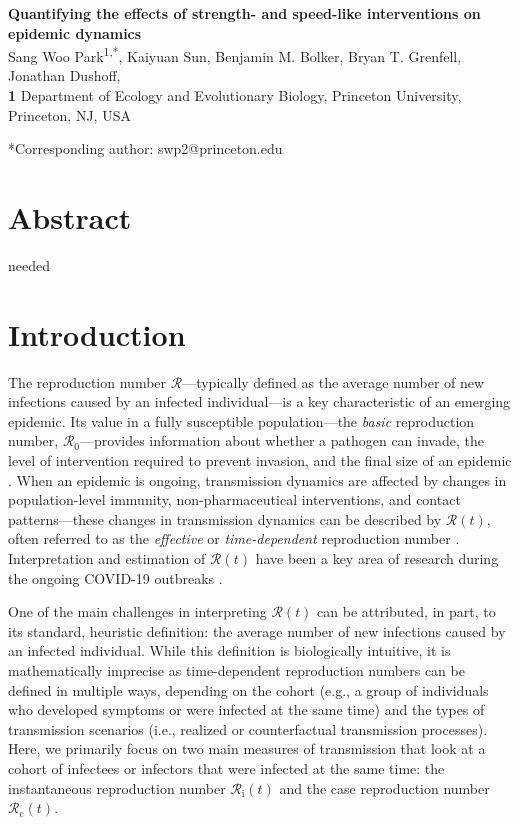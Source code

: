 \documentclass[12pt]{article}
\date{\today}
\newcommand{\comment}{}
\renewcommand{\comment}{\showcomment}
\renewcommand{\comment}{\nocomment}
\newcommand{\showcomment}[3]{\textcolor{#1}{\textbf{[#2: }\textsl{#3}\textbf{]}}}
\newcommand{\nocomment}[3]{}
\newcommand{\swp}[1]{\comment{magenta}{SWP}{#1}}
\newcommand{\Rx}[1]{\ensuremath{{\mathcal R}_{#1}}\xspace}
\newcommand{\Ro}{\Rx{0}}
\newcommand{\Rc}{\Rx{\mathrm{c}}}
\newcommand{\Ri}{\Rx{\mathrm{i}}}
\newcommand{\RR}{\ensuremath{{\mathcal R}}\xspace}
\begin{document}
\begin{flushleft}{
	{\large \textbf{\newline
		Quantifying the effects of strength- and speed-like interventions on epidemic dynamics
	}
	}
}
\newline
\\
Sang Woo Park\textsuperscript{1,*}, Kaiyuan Sun, Benjamin M. Bolker, Bryan T. Grenfell, Jonathan Dushoff, \swp{and others if needed}
\\
\bigskip
\textbf{1} Department of Ecology and Evolutionary Biology, Princeton University, Princeton, NJ, USA
\\
\bigskip

*Corresponding author: swp2@princeton.edu
\end{flushleft}

\section*{Abstract}

needed

\section{Introduction}

The reproduction number \RR---typically defined as the average number of new infections caused by an infected individual---is a key characteristic of an emerging epidemic.
Its value in a fully susceptible population---the \emph{basic} reproduction number, \Ro---provides information about whether a pathogen can invade, the level of intervention required to prevent invasion, and the final size of an epidemic \citep{diekmann1990definition,anderson1991infectious}.
When an epidemic is ongoing, transmission dynamics are affected by changes in population-level immunity, non-pharmaceutical interventions, and contact patterns---these changes in transmission dynamics can be described by $\RR(t)$, often referred to as the \emph{effective} or \emph{time-dependent} reproduction number \citep{wallinga2004different, fraser2007estimating, cori2013new}.
Interpretation and estimation of $\RR(t)$ have been a key area of research during the ongoing COVID-19 outbreaks \citep{pan2020association,flaxman2020estimating,gostic2020practical}.

One of the main challenges in interpreting $\RR(t)$ can be attributed, in part, to its standard, heuristic definition: the average number of new infections caused by an infected individual.
While this definition is biologically intuitive, it is mathematically imprecise as time-dependent reproduction numbers can be defined in multiple ways, depending on the cohort (e.g., a group of individuals who developed symptoms or were infected at the same time) and the types of transmission scenarios (i.e., realized or counterfactual transmission processes).
Here, we primarily focus on two main measures of transmission that look at a cohort of infectees or infectors that were infected at the same time: the instantaneous reproduction number $\Ri(t)$ and the case reproduction number $\Rc(t)$.
\end{document}
